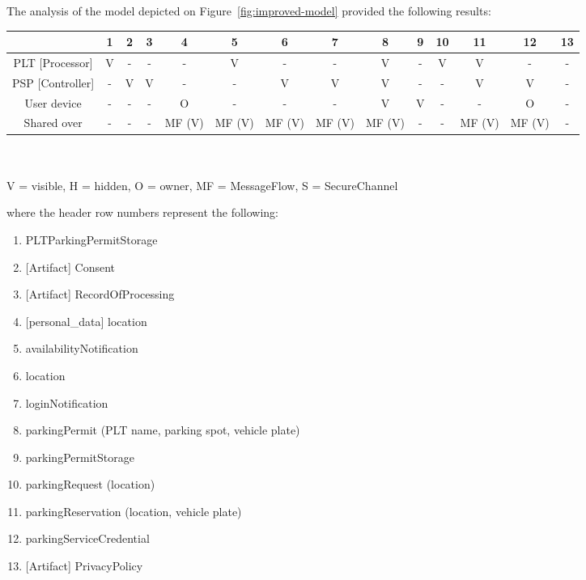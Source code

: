 \newpage
The analysis of the model depicted on Figure~\ref{fig:improved-model} provided
the following results:

\begin{center}
\begin{tabular}{ |c||c|c|c|c|c|c|c|c|c|c|c|c|c| } 
    \hline
    & 1 & 2 & 3 & 4 & 5 & 6 & 7 & 8 & 9 & 10 & 11 & 12 & 13\\ 
    \hline
    \hline
    PLT [Processor] & V & - & - & - & V & - & - & V & - & V & V & - & -\\
    \hline
    PSP [Controller] & - & V & V & - & - & V & V & V & - & - & V & V & -\\
    \hline
    User device & - & - & - & O & - & - & - & V & V & - & - & O & -\\
    \hline
    \hline
    Shared over & - & - & - &
    \multicolumn{1}{m{1.2em}|}{MF (V)} &
    \multicolumn{1}{m{1.2em}|}{MF (V)} &
    \multicolumn{1}{m{1.2em}|}{MF (V)} &
    \multicolumn{1}{m{1.2em}|}{MF (V)} &
    \multicolumn{1}{m{1.2em}|}{MF (V)} &
    - & - &
    \multicolumn{1}{m{1.2em}|}{MF (V)} &
    \multicolumn{1}{m{1.2em}|}{MF (V)} & -\\
    \hline
\end{tabular}
\\~\\
V = visible, H = hidden, O = owner, MF = MessageFlow, S = SecureChannel
\end{center}
where the header row numbers represent the following:
\begin{enumerate}
    \item PLTParkingPermitStorage
    \item {[Artifact]} Consent
    \item {[Artifact]} RecordOfProcessing
    \item {[personal\_data]} location
    \item availabilityNotification
    \item location
    \item loginNotification
    \item parkingPermit (PLT name, parking spot, vehicle plate)
    \item parkingPermitStorage
    \item parkingRequest (location)
    \item parkingReservation (location, vehicle plate)
    \item parkingServiceCredential
    \item {[Artifact]} PrivacyPolicy
\end{enumerate}

